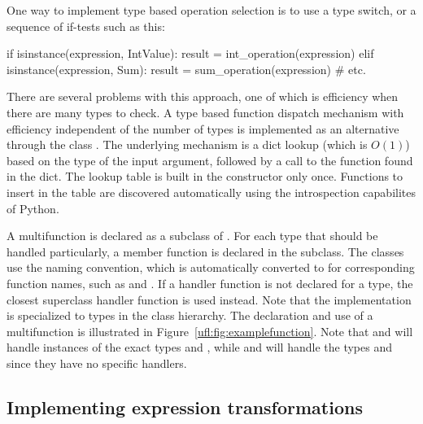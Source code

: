 One way to implement type based operation selection is to use a type
switch, or a sequence of if-tests such as this:
\begin{python}
if isinstance(expression, IntValue):
    result = int_operation(expression)
elif isinstance(expression, Sum):
    result = sum_operation(expression)
# etc.
\end{python}
There are several problems with this approach, one of which is
efficiency when there are many types to check.  A type based function
dispatch mechanism with efficiency independent of the number of types
is implemented as an alternative through the class
.  The underlying mechanism is a dict lookup
(which is $O(1)$) based on the type of the input argument, followed by
a call to the function found in the dict. The lookup table is built in
the  constructor only once.  Functions to insert
in the table are discovered automatically using the introspection
capabilites of Python.

A multifunction is declared as a subclass of
. For each type that should be handled
particularly, a member function is declared in the subclass.  The
 classes use the  naming convention,
which is automatically converted to  for
corresponding function names, such as  and
.  If a handler function is not declared for a
type, the closest superclass handler function is used instead.  Note
that the  implementation is specialized to types
in the  class hierarchy.  The declaration and use of a
multifunction is illustrated in Figure~\ref{ufl:fig:examplefunction}.
Note that  and  will handle
instances of the exact types  and ,
while  and  will handle the types
 and  since they have no
specific handlers.

\subsection{Implementing expression transformations} \label{ufl:sec:transformer}

